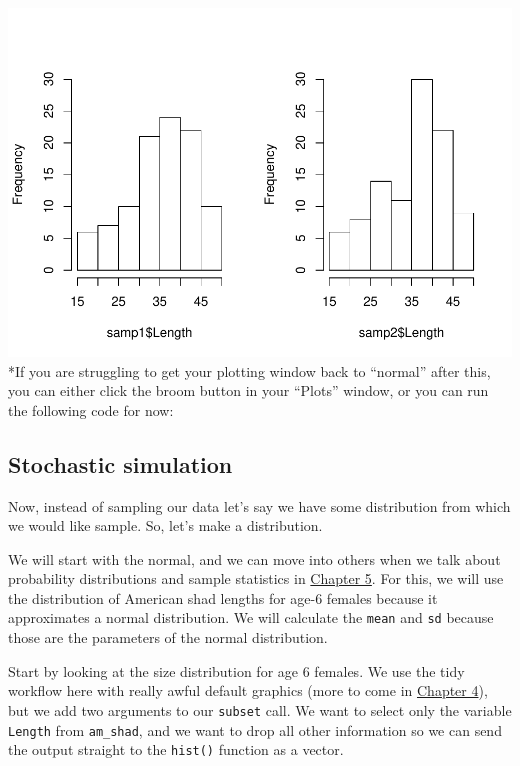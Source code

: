 \documentclass[
]{book}
\newenvironment{Shaded}{\begin{snugshade}}{\end{snugshade}}
\newcommand{\DataTypeTok}[1]{\textcolor[rgb]{0.13,0.29,0.53}{#1}}
\newcommand{\DecValTok}[1]{\textcolor[rgb]{0.00,0.00,0.81}{#1}}
\newcommand{\KeywordTok}[1]{\textcolor[rgb]{0.13,0.29,0.53}{\textbf{#1}}}
\newcommand{\NormalTok}[1]{#1}
\newcommand{\OperatorTok}[1]{\textcolor[rgb]{0.81,0.36,0.00}{\textbf{#1}}}
\newcommand{\OtherTok}[1]{\textcolor[rgb]{0.56,0.35,0.01}{#1}}
\newcommand{\StringTok}[1]{\textcolor[rgb]{0.31,0.60,0.02}{#1}}
\begin{document}
\includegraphics{worstr_files/figure-latex/unnamed-chunk-79-1.pdf}
*If you are struggling to get your plotting window back to ``normal'' after this, you can either click the broom button in your ``Plots'' window, or you can run the following code for now:

\hypertarget{stochastic}{%
\subsection{Stochastic simulation}\label{stochastic}}

Now, instead of sampling our data let's say we have some distribution from which we would like sample. So, let's make a distribution.

We will start with the normal, and we can move into others when we talk about probability distributions and sample statistics in \protect\hyperlink{Chapter5}{Chapter 5}. For this, we will use the distribution of American shad lengths for age-6 females because it approximates a normal distribution. We will calculate the \texttt{mean} and \texttt{sd} because those are the parameters of the normal distribution.

Start by looking at the size distribution for age 6 females. We use the tidy workflow here with really awful default graphics (more to come in \protect\hyperlink{Chapter4}{Chapter 4}), but we add two arguments to our \texttt{subset} call. We want to select only the variable \texttt{Length} from \texttt{am\_shad}, and we want to drop all other information so we can send the output straight to the \texttt{hist()} function as a vector.

\begin{Shaded}
\end{Shaded}
\end{document}
